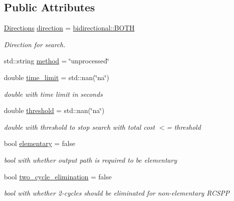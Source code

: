 \subsection*{Public Attributes}
\begin{DoxyCompactItemize}
\item 
\hyperlink{namespacebidirectional_a4cbe6f0bfbd3629c2cd44c98014aed70}{Directions} \hyperlink{classbidirectional_1_1Params_a1d461034d1a1e04fa7f00cb63cd230d8}{direction} = \hyperlink{namespacebidirectional_a4cbe6f0bfbd3629c2cd44c98014aed70ab50b3fbd895a667b43b3e9eb3bd54f85}{bidirectional\+::\+B\+O\+TH}
\begin{DoxyCompactList}\small\item\em Direction for search. \end{DoxyCompactList}\item 
std\+::string \hyperlink{classbidirectional_1_1Params_a2faf36e89993c9fd0979e3e42b2332ea}{method} = \char`\"{}unprocessed\char`\"{}
\item 
double \hyperlink{classbidirectional_1_1Params_a2c0fd34b19d753cfce75690a5d68e1e1}{time\+\_\+limit} = std\+::nan(\char`\"{}na\char`\"{})
\begin{DoxyCompactList}\small\item\em double with time limit in seconds \end{DoxyCompactList}\item 
double \hyperlink{classbidirectional_1_1Params_ac7099f442d46b684fcbe55ba9c6657e4}{threshold} = std\+::nan(\char`\"{}na\char`\"{})
\begin{DoxyCompactList}\small\item\em double with threshold to stop search with total cost $<$= threshold \end{DoxyCompactList}\item 
bool \hyperlink{classbidirectional_1_1Params_aa19060565463ffc251019a1dea026e6d}{elementary} = false
\begin{DoxyCompactList}\small\item\em bool with whether output path is required to be elementary \end{DoxyCompactList}\item 
bool \hyperlink{classbidirectional_1_1Params_ade4211d18d72a33dccb323ea1861fe70}{two\+\_\+cycle\+\_\+elimination} = false
\begin{DoxyCompactList}\small\item\em bool with whether 2-\/cycles should be eliminated for non-\/elementary R\+C\+S\+PP \end{DoxyCompactList}\item 

\end{DoxyCompactItemize}
